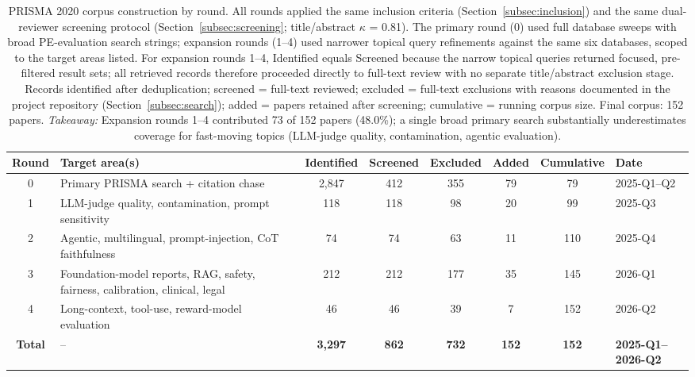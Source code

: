 \documentclass[acmsmall, nonacm, screen]{acmart}
\begin{document}
\begin{table}[!htbp]
\renewcommand{\arraystretch}{1.05}
\caption{PRISMA 2020 corpus construction by round. All rounds applied
the same inclusion criteria (Section~\ref{subsec:inclusion}) and the
same dual-reviewer screening protocol (Section~\ref{subsec:screening};
title/abstract $\kappa$ = 0.81). The primary round (0) used full
database sweeps with broad PE-evaluation search strings; expansion
rounds (1--4) used narrower topical query refinements against the
same six databases, scoped to the target areas listed. For expansion
rounds 1--4, Identified equals Screened because the narrow topical
queries returned focused, pre-filtered result sets; all retrieved
records therefore proceeded directly to full-text review with no
separate title/abstract exclusion stage. Records identified after
deduplication; screened = full-text reviewed; excluded = full-text
exclusions with reasons documented in the project repository
(Section~\ref{subsec:search}); added = papers retained after
screening; cumulative = running corpus size. Final corpus: 152 papers.
\textit{Takeaway:} Expansion rounds 1--4 contributed 73 of 152 papers (48.0\%); a single broad primary search substantially underestimates coverage for fast-moving topics (LLM-judge quality, contamination, agentic evaluation).}
\label{tab:expansion_rounds}
\centering
\scriptsize
\setlength{\tabcolsep}{4pt}
\begin{tabular}{c p{3.5cm} c c c c c l}
\toprule
\textbf{Round} & \textbf{Target area(s)} & \textbf{Identified} & \textbf{Screened} & \textbf{Excluded} & \textbf{Added} & \textbf{Cumulative} & \textbf{Date} \\
\midrule
0 & Primary PRISMA search + citation chase                                         & 2,847 & 412 & 355 & 79  & 79  & 2025-Q1--Q2 \\
1 & LLM-judge quality, contamination, prompt sensitivity                           &   118 & 118 &  98 & 20  &  99 & 2025-Q3 \\
2 & Agentic, multilingual, prompt-injection, CoT faithfulness                      &    74 &  74 &  63 & 11  & 110 & 2025-Q4 \\
3 & Foundation-model reports, RAG, safety, fairness, calibration, clinical, legal  &   212 & 212 & 177 & 35  & 145 & 2026-Q1 \\
4 & Long-context, tool-use, reward-model evaluation                                &    46 &  46 &  39 &  7  & 152 & 2026-Q2 \\
\midrule
\textbf{Total} & {--} & \textbf{3,297} & \textbf{862} & \textbf{732} & \textbf{152} & \textbf{152} & \textbf{2025-Q1--2026-Q2} \\
\bottomrule
\end{tabular}
\end{table}
\end{document}
